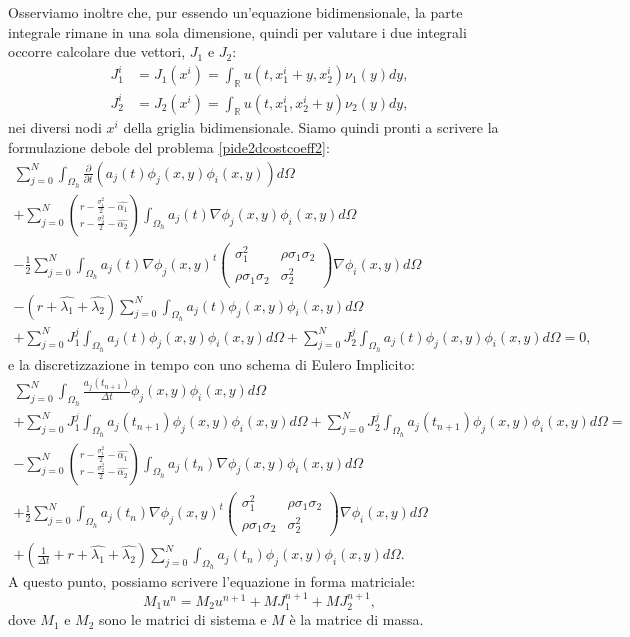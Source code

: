 \documentclass[a4paper,10pt]{report}
\theoremstyle{plain}
\theoremstyle{definition}
\theoremstyle{remark}
\begin{document}
Osserviamo inoltre che, pur essendo un'equazione bidimensionale, la parte integrale rimane in una sola dimensione, quindi per valutare i due integrali occorre calcolare due vettori, $J_1$ e $J_2$:
\begin{align*}
J_1^i&=J_1(x^i)=\int_\mathbb{R}u(t,x_1^i+y,x_2^i)\nu_1(y)dy,\\
J_2^i&=J_2(x^i)=\int_\mathbb{R}u(t,x_1^i,x_2^i+y)\nu_2(y)dy,
\end{align*}
nei diversi nodi $x^i$ della griglia bidimensionale. Siamo quindi pronti a scrivere la formulazione debole del problema \eqref{pide2dcostcoeff2}:
\begin{multline}
\sum_{j=0}^{N}\int_{\Omega_h}\frac{\partial}{\partial t}\left(a_j(t)\phi_j(x,y)\phi_i(x,y)\right)d\Omega\\
+\sum_{j=0}^{N}\binom{r-\frac{\sigma_1^2}{2}-\hat{\alpha_1}}{r-\frac{\sigma_2^2}{2}-\hat{\alpha_2}}\int_{\Omega_h}a_j(t)\nabla\phi_j(x,y)\phi_i(x,y)d\Omega\\
-\frac{1}{2}\sum_{j=0}^{N}\int_{\Omega_h}a_j(t)\nabla\phi_j(x,y)^t\left(\begin{matrix}\sigma_1^2 & \rho\sigma_1\sigma_2\\ \rho\sigma_1\sigma_2 & \sigma_2^2 \end{matrix}\right)\nabla\phi_i(x,y)d\Omega\\
-(r+\hat{\lambda_1}+\hat{\lambda_2})\sum_{j=0}^{N}\int_{\Omega_h}a_j(t)\phi_j(x,y)\phi_i(x,y)d\Omega\\
+\sum_{j=0}^{N}J^j_1\int_{\Omega_h}a_j(t)\phi_j(x,y)\phi_i(x,y)d\Omega+\sum_{j=0}^{N}J^j_2\int_{\Omega_h}a_j(t)\phi_j(x,y)\phi_i(x,y)d\Omega=0,
\end{multline}
e la discretizzazione in tempo con uno schema di Eulero Implicito:
\begin{multline}
\sum_{j=0}^{N}\int_{\Omega_h}\frac{a_j(t_{n+1})}{\Delta t}\phi_j(x,y)\phi_i(x,y)d\Omega\\
+\sum_{j=0}^{N}J^j_1\int_{\Omega_h}a_j(t_{n+1})\phi_j(x,y)\phi_i(x,y)d\Omega+\sum_{j=0}^{N}J^j_2\int_{\Omega_h}a_j(t_{n+1})\phi_j(x,y)\phi_i(x,y)d\Omega=\\
-\sum_{j=0}^{N}\binom{r-\frac{\sigma_1^2}{2}-\hat{\alpha_1}}{r-\frac{\sigma_2^2}{2}-\hat{\alpha_2}}\int_{\Omega_h}a_j(t_n)\nabla\phi_j(x,y)\phi_i(x,y)d\Omega\\
+\frac{1}{2}\sum_{j=0}^{N}\int_{\Omega_h}a_j(t_n)\nabla\phi_j(x,y)^t\left(\begin{matrix}\sigma_1^2 & \rho\sigma_1\sigma_2\\ \rho\sigma_1\sigma_2 & \sigma_2^2 \end{matrix}\right)\nabla\phi_i(x,y)d\Omega\\
+\left(\frac{1}{\Delta t}+r+\hat{\lambda_1}+\hat{\lambda_2}\right)\sum_{j=0}^{N}\int_{\Omega_h}a_j(t_n)\phi_j(x,y)\phi_i(x,y)d\Omega.
\end{multline}
A questo punto, possiamo scrivere l'equazione in forma matriciale: $$M_1u^n=M_2u^{n+1}+MJ_1^{n+1}+MJ_2^{n+1},$$ dove $M_1$ e $M_2$ sono le matrici di sistema e $M$ \`e la matrice di massa.
\end{document}
